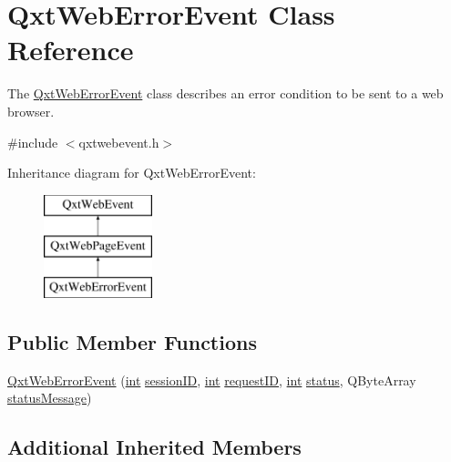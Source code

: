 \hypertarget{class_qxt_web_error_event}{\section{Qxt\-Web\-Error\-Event Class Reference}
\label{class_qxt_web_error_event}
}


The \hyperlink{class_qxt_web_error_event}{Qxt\-Web\-Error\-Event} class describes an error condition to be sent to a web browser.  




{\ttfamily \#include $<$qxtwebevent.\-h$>$}

Inheritance diagram for Qxt\-Web\-Error\-Event\-:\begin{figure}[H]
\begin{center}
\leavevmode
\includegraphics[height=3.000000cm]{class_qxt_web_error_event}
\end{center}
\end{figure}
\subsection*{Public Member Functions}
\begin{DoxyCompactItemize}
\item 
\hyperlink{class_qxt_web_error_event_a584a6f76f8dd49c612067a53ed5c3e7b}{Qxt\-Web\-Error\-Event} (\hyperlink{ioapi_8h_a787fa3cf048117ba7123753c1e74fcd6}{int} \hyperlink{class_qxt_web_event_a3fdb1d80c46e535c2c79a06269a5d307}{session\-I\-D}, \hyperlink{ioapi_8h_a787fa3cf048117ba7123753c1e74fcd6}{int} \hyperlink{class_qxt_web_page_event_a144c8010cc1c9d239bf5de4c72d09f7a}{request\-I\-D}, \hyperlink{ioapi_8h_a787fa3cf048117ba7123753c1e74fcd6}{int} \hyperlink{class_qxt_web_page_event_a3faa95fe00502400daa87a3a88e50d86}{status}, Q\-Byte\-Array \hyperlink{class_qxt_web_page_event_a4462b06516d2a680530b57dd37610da6}{status\-Message})
\end{DoxyCompactItemize}
\subsection*{Additional Inherited Members}


